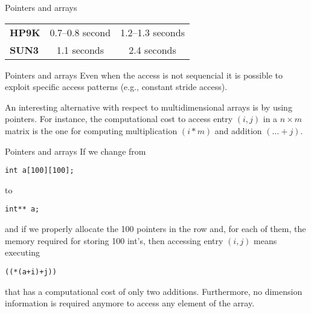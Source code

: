 \begin{frame}[fragile]{Pointers and arrays}

\begin{tabular}{lcc}
\textbf{HP9K} & 0.7--0.8 second & 1.2--1.3 seconds \\
\textbf{SUN3} & 1.1 seconds & 2.4 seconds
\end{tabular}


\end{frame}
\begin{frame}[fragile]{Pointers and arrays}
Even when the access is not sequencial it is possible to
exploit specific access patterns (e.g., constant stride access).


\vspace{20pt}

An interesting alternative with respect to multidimensional
arrays is by using pointers.
For instance, the computational cost to access entry $(i,j)$ in
a $n\times m$ matrix is the one for computing multiplication
$(i*m)$ and addition $(\dots +j)$.


\end{frame}
\begin{frame}[fragile]{Pointers and arrays}
If we change from


\vspace{20pt}

\begin{center}
\tt int a[100][100];
\end{center}

to

\begin{center}
\tt int** a;
\end{center}

\vspace{20pt}

and if we properly allocate the 100 pointers in the row and,
for each of them, the memory required for storing 100 int's,
then accessing entry $(i,j)$ means executing

\vspace{20pt}

\begin{center}
\tt *((*(a+i)+j))
\end{center}

\vspace{20pt}

that has a computational cost of only two additions.
Furthermore, no dimension information is required anymore
to access any element of the array.

\end{frame}
